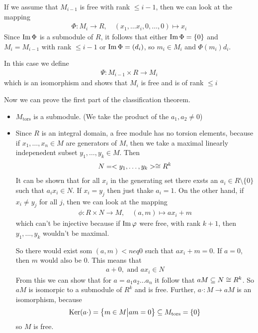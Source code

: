 If we assume that $M_{i-1}$ is free with rank $\leq i-1$, then we can look at the mapping
\begin{align*}
	\Phi: M_i \to R, \quad (x_1, \ldots x_i, 0, \ldots, 0) \mapsto x_i
\end{align*}
Since $\operatorname{Im} \Phi$ is a submodule of $R$, it follows that either $\operatorname{Im} \Phi = \{0\}$ and $M_i = M_{i-1}$ with rank $\leq i-1$ or $\operatorname{Im} \Phi = (d_i)$, so $m_i \in M_i$ and $\Phi(m_i) d_i$.

In this case we define
\begin{align*}
	\Psi: M_{i-1} \times R \to M_i
\end{align*} 
which is an isomorphism and shows that $M_i$ is free and is of rank $\leq i$


Now we can prove the first part of the classification theorem.

\begin{itemize}
	\item $M_{\text{tors}}$ is a submodule. (We take the product of the $a_1,a_2 \neq 0$)
	\item Since $R$ is an integral domain, a free module has no torsion elements, because if $x_{1}, \ldots, x_{n} \in M$ are generators of $M$, then we take a maximal linearly indepenedent subset $y_{1}, \ldots, y_{k} \in M$. Then
		\begin{align*}
			N = <y_{1}, \ldots, y_{k}> \cong R^{k}
		\end{align*}
		It can be shown that for all $x_i$ in the generating set there exsts an $a_i \in R \setminus \{0\}$ such that $a_ix_i \in N$. If $x_i = y_j$ then just thake $a_i = 1$. On the other hand, if $x_i \neq y_j$ for all $j$, then we can look at the mapping
		\begin{align*}
			\phi: R \times N \to M, \quad (a,m) \mapsto ax_i + m
		\end{align*}
		which can't be injective because if $\operatorname{Im} \varphi$ were free, with rank $k+1$, then $y_1, \ldots, y_k$ wouldn't be maximal. 

		So there would exist som $(a,m) <neq 0$ such that $ax_i + m = 0$. If $a = 0$, then $m$ would also be $0$. This means that
		\begin{align*}
			a + 0, \text{ and } ax_i \in N
		\end{align*}
From this we can show that for $a = a_1 a_2 \dots a_n$ it follow that $aM \subseteq N \cong R^{k}$. So $aM$ is isomorpic to a submodule of $R^{k}$ and is free. Further, $a \cdot: M \to aM$ is an isomorphism, because
		\begin{align*}
			\operatorname{Ker}(a \cdot) = \left\{m \in M \big\vert am = 0\right\} \subseteq M_{\text{tors}} = \{0\}
		\end{align*}
		so $M$ is free.
\end{itemize}

